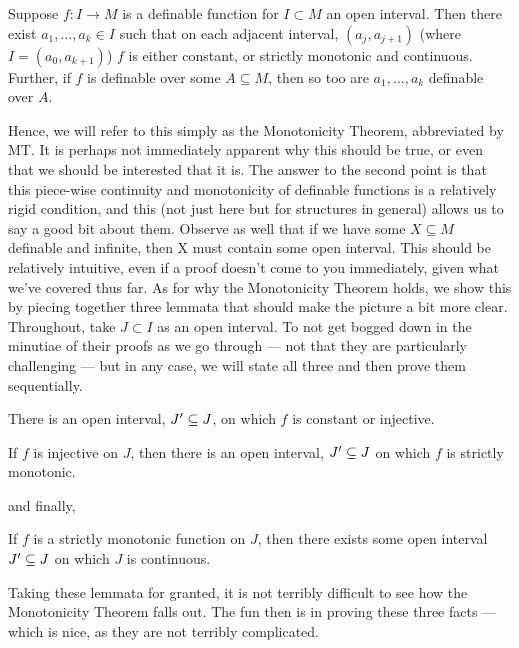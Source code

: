 \begin{theorem}
	\label{thm:monotonicity}
  Suppose $f \colon I \to M$ is a definable function for $I \subset M$ an open interval. Then there exist $a_1, \hdots, a_k \in I$ such that on each adjacent interval, $(a_j, a_{j+1})$ (where $I = (a_0, a_{k+1})$) $f$ is either constant, or strictly monotonic and continuous. Further, if $f$ is definable over some $A \subseteq M$, then so too are $a_1, \hdots, a_{k}$ definable over $A$.
\end{theorem}

Hence, we will refer to this simply as the Monotonicity Theorem, abbreviated by MT. It is perhaps not immediately apparent why this should be true, or even that we should be interested that it is. The answer to the second point is that this piece-wise continuity and monotonicity of definable functions is a relatively rigid condition, and this (not just here but for structures in general) allows us to say a good bit about them. Observe as well that if we have some $X \subseteq M$ definable and infinite, then X must contain some open interval. This should be relatively intuitive, even if a proof doesn't come to you immediately, given what we've covered thus far. As for why the Monotonicity Theorem holds, we show this by piecing together three lemmata that should make the picture a bit more clear. Throughout, take $J \subset I$ as an open interval. To not get bogged down in the minutiae of their proofs as we go through — not that they are particularly challenging — but in any case, we will state all three and then prove them sequentially.

\begin{lemma}
\label{lemma:monotonic-1}
  There is an open interval, $J^{\prime} \subseteq J$, on which $f$ is constant or injective.
\end{lemma}

\begin{lemma}
\label{lemma:monotonic-2}
  If $f$ is injective on $J$, then there is an open interval, $J^{\prime} \subseteq J$ on which $f$ is strictly monotonic.
\end{lemma}

and finally,

\begin{lemma}
\label{lemma:monotonic-3}
  If $f$ is a strictly monotonic function on $J$, then there exists some open interval $ J^{\prime} \subseteq J$ on which $J$ is continuous.
\end{lemma}

Taking these lemmata for granted, it is not terribly difficult to see how the Monotonicity Theorem falls out. The fun then is in proving these three facts — which is nice, as they are not terribly complicated.

